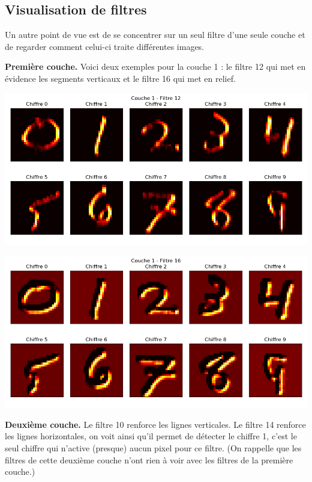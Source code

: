 \documentclass[11pt,class=report,crop=false]{standalone}
\begin{document}
\subsection{Visualisation de filtres}

Un autre point de vue est de se concentrer sur un seul filtre d'une seule couche et de regarder comment celui-ci traite différentes images.


\textbf{Première couche.}
Voici deux exemples pour la couche 1 : le filtre 12 qui met en évidence les segments verticaux et le filtre 16 qui met en relief.
\begin{center}
\includegraphics[scale=\myscale,scale=0.5]{figures/tfconv-viz3-c1-f12}
\end{center}

\begin{center}
\includegraphics[scale=\myscale,scale=0.5]{figures/tfconv-viz3-c1-f16}
\end{center}

\bigskip
\textbf{Deuxième couche.}
Le filtre 10 renforce les lignes verticales. Le filtre 14 renforce les lignes horizontales, on voit ainsi qu'il permet de détecter le chiffre 1, c'est le seul chiffre qui n'active (presque) aucun pixel pour ce filtre. (On rappelle que les filtres de cette deuxième couche n'ont rien à voir avec les filtres de la première couche.)
\end{document}
